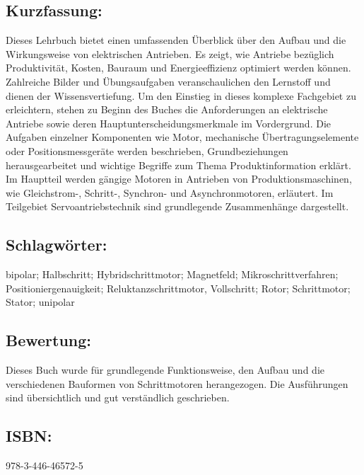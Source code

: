 \begin{minipage}{0.48\textwidth}
\subsection*{Kurzfassung:}
Dieses Lehrbuch bietet einen umfassenden Überblick über den Aufbau und die Wirkungsweise von elektrischen Antrieben. Es zeigt, wie Antriebe bezüglich Produktivität, Kosten, Bauraum und Energieeffizienz optimiert werden können. Zahlreiche Bilder und Übungsaufgaben veranschaulichen den Lernstoff und dienen der Wissensvertiefung. Um den Einstieg in dieses komplexe Fachgebiet zu erleichtern, stehen zu Beginn des Buches die Anforderungen an elektrische Antriebe sowie deren Hauptunterscheidungsmerkmale im Vordergrund. Die Aufgaben einzelner Komponenten wie Motor, mechanische Übertragungselemente oder Positionsmessgeräte werden beschrieben, Grundbeziehungen herausgearbeitet und wichtige Begriffe zum Thema Produktinformation erklärt. Im Hauptteil werden gängige Motoren in Antrieben von Produktionsmaschinen, wie Gleichstrom-, Schritt-, Synchron- und Asynchronmotoren, erläutert. Im Teilgebiet Servoantriebstechnik sind grundlegende Zusammenhänge dargestellt.
\end{minipage}
\subsection*{Schlagwörter:}
bipolar; Halbschritt; Hybridschrittmotor; Magnetfeld; Mikroschrittverfahren; Positioniergenauigkeit; Reluktanzschrittmotor, Vollschritt; Rotor; Schrittmotor; Stator; unipolar
\subsection*{Bewertung:}
Dieses Buch wurde für grundlegende Funktionsweise, den Aufbau und die verschiedenen Bauformen von Schrittmotoren herangezogen. Die Ausführungen sind übersichtlich und gut verständlich geschrieben.
\subsection*{ISBN:}
978-3-446-46572-5

